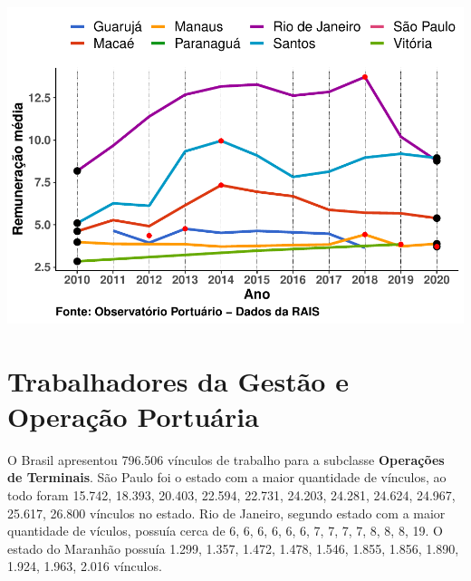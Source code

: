 \documentclass[
]{article}
\begin{document}
\includegraphics{mercado_trabalho_files/figure-latex/g_operacao_municipio-1.pdf}

\hypertarget{trabalhadores-da-gestuxe3o-e-operauxe7uxe3o-portuuxe1ria}{%
\section{Trabalhadores da Gestão e Operação
Portuária}\label{trabalhadores-da-gestuxe3o-e-operauxe7uxe3o-portuuxe1ria}}

O Brasil apresentou 796.506 vínculos de trabalho para a subclasse
\textbf{Operações de Terminais}. São Paulo foi o estado com a maior
quantidade de vínculos, ao todo foram 15.742, 18.393, 20.403, 22.594,
22.731, 24.203, 24.281, 24.624, 24.967, 25.617, 26.800 vínculos no
estado. Rio de Janeiro, segundo estado com a maior quantidade de
vículos, possuía cerca de 6, 6, 6, 6, 6, 6, 7, 7, 7, 7, 8, 8, 8, 19. O
estado do Maranhão possuía 1.299, 1.357, 1.472, 1.478, 1.546, 1.855,
1.856, 1.890, 1.924, 1.963, 2.016 vínculos.
\end{document}
